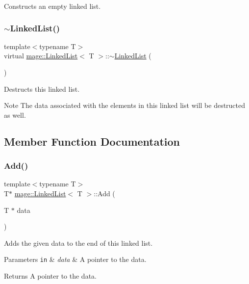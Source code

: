 Constructs an empty linked list. \hypertarget{classmage_1_1_linked_list_a88cb2ec52e90f3658d9735b4948cccdb}{}\label{classmage_1_1_linked_list_a88cb2ec52e90f3658d9735b4948cccdb} 
\subsubsection{\texorpdfstring{$\sim$\+Linked\+List()}{~LinkedList()}}
{\footnotesize\ttfamily template$<$typename T$>$ \\
virtual \hyperlink{classmage_1_1_linked_list}{mage\+::\+Linked\+List}$<$ T $>$\+::$\sim$\hyperlink{classmage_1_1_linked_list}{Linked\+List} (\begin{DoxyParamCaption}{ }\end{DoxyParamCaption})\hspace{0.3cm}{\ttfamily [virtual]}}

Destructs this linked list.

\begin{DoxyNote}{Note}
The data associated with the elements in this linked list will be destructed as well. 
\end{DoxyNote}


\subsection{Member Function Documentation}
\hypertarget{classmage_1_1_linked_list_ac6cd236aab89f296d3c112c05b2337e2}{}\label{classmage_1_1_linked_list_ac6cd236aab89f296d3c112c05b2337e2} 
\subsubsection{\texorpdfstring{Add()}{Add()}}
{\footnotesize\ttfamily template$<$typename T$>$ \\
T$\ast$ \hyperlink{classmage_1_1_linked_list}{mage\+::\+Linked\+List}$<$ T $>$\+::Add (\begin{DoxyParamCaption}\item[{T $\ast$}]{data }\end{DoxyParamCaption})}

Adds the given data to the end of this linked list.


\begin{DoxyParams}[1]{Parameters}
\mbox{\tt in}  & {\em data} & A pointer to the data. \\
\hline
\end{DoxyParams}
\begin{DoxyReturn}{Returns}
A pointer to the data. 
\end{DoxyReturn}
\hypertarget{classmage_1_1_linked_list_a4176d80548f1ec5ca98fb18c16339de8}{}\label{classmage_1_1_linked_list_a4176d80548f1ec5ca98fb18c16339de8} 
